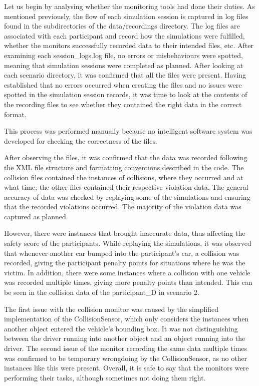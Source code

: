 Let us begin by analysing whether the monitoring tools had done their duties. As mentioned previously, the flow of each simulation session is captured in log files found in the subdirectories of the data/recordings directory. The log files are associated with each participant and record how the simulations were fulfilled, whether the monitors successfully recorded data to their intended files, etc. After examining each session\_logs.log file, no errors or misbehaviours were spotted, meaning that simulation sessions were completed as planned. After looking at each scenario directory, it was confirmed that all the files were present. Having established that no errors occurred when creating the files and no issues were spotted in the simulation session records, it was time to look at the contents of the recording files to see whether they contained the right data in the correct format.

This process was performed manually because no intelligent software system was developed for checking the correctness of the files.

After observing the files, it was confirmed that the data was recorded following the XML file structure and formatting conventions described in the code. The collision files contained the instances of collisions, where they occurred and at what time; the other files contained their respective violation data. The general accuracy of data was checked by replaying some of the simulations and ensuring that the recorded violations occurred. The majority of the violation data was captured as planned.

However, there were instances that brought inaccurate data, thus affecting the safety score of the participants. While replaying the simulations, it was observed that whenever another car bumped into the participant's car, a collision was recorded, giving the participant penalty points for situations where he was the victim. In addition, there were some instances where a collision with one vehicle was recorded multiple times, giving more penalty points than intended. This can be seen in the collision data of the participant\_D in scenario 2.

The first issue with the collision monitor was caused by the simplified implementation of the CollisionSensor, which only considers the instances when another object entered the vehicle's bounding box. It was not distinguishing between the driver running into another object and an object running into the driver. The second issue of the monitor recording the same data multiple times was confirmed to be temporary wrongdoing by the CollisionSensor, as no other instances like this were present. Overall, it is safe to say that the monitors were performing their tasks, although sometimes not doing them right.


